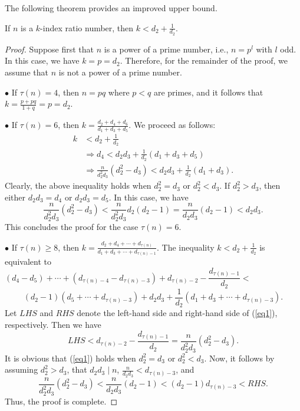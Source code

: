 \documentclass[12pt,reqno]{article}
\begin{document}
The following theorem provides an improved upper bound.

\begin{theorem}\label{th1}
If $n$ is a $k$-index ratio number, then $k<d_2+\frac{1}{d_2}$.
\end{theorem}

\begin{proof}
Suppose first that \( n \) is a power of a prime number, i.e., \( n = p^l \) with \( l \) odd. In this case, we have \( k = p = d_2 \). Therefore, for the remainder of the proof, we assume that \( n \) is not a power of a prime number.

\noindent$\bullet$ If \( \tau(n) = 4 \), then \( n = pq \) where \( p < q \) are primes, and it follows that \( k = \frac{p + pq}{1 + q} = p = d_2 \).

\noindent$\bullet$ If \( \tau(n) = 6 \), then \( k = \frac{d_2 + d_4 + d_6}{d_1 + d_3 + d_5} \). We proceed as follows:
\begin{align*}
k &< d_2 + \frac{1}{d_2} \\
&\Rightarrow d_4 < d_2 d_3 + \frac{1}{d_2} (d_1 + d_3 + d_5) \\
&\Rightarrow \frac{n}{d_2^2 d_3} \left( d_2^2 - d_3 \right) < d_2 d_3 +\frac{1}{d_2} (d_1 + d_3).
\end{align*}
Clearly, the above inequality holds when \( d_2^2 = d_3 \) or \( d_2^2 < d_3 \). If \( d_2^2 > d_3 \), then either \( d_2 d_3 = d_4 \) or \( d_2 d_3 = d_5 \). In this case, we have
\begin{equation*}
\frac{n}{d_2^2 d_3} \left( d_2^2 - d_3 \right) < \frac{n}{d_2^2 d_3} d_2 \left( d_2 - 1 \right) = \frac{n}{d_2 d_3} \left( d_2 - 1 \right) < d_2 d_3.
\end{equation*}
This concludes the proof for the case \( \tau(n) = 6 \).

\noindent$\bullet$ If \( \tau(n) \geq 8 \), then \( k = \frac{d_2 + d_4 + \cdots + d_{\tau(n)}}{d_1 + d_3 + \cdots + d_{\tau(n)-1}} \). The inequality \( k < d_2 + \frac{1}{d_2} \) is equivalent to
\\$(d_4-d_5)+\cdots+(d_{\tau(n)-4}-d_{\tau(n)-3})+d_{\tau(n)-2}-\dfrac{d_{\tau(n)-1}}{d_2}<$
\begin{equation}\label{eq1}
(d_2-1)(d_5+\cdots+d_{\tau(n)-3})+d_2d_3+\frac{1}{d_2}(d_1+d_3+\cdots+d_{\tau(n)-3}).
\end{equation}
Let \( LHS \) and \( RHS \) denote the left-hand side and right-hand side of (\ref{eq1}), respectively. Then we have
\begin{equation*}
LHS < d_{\tau(n)-2} - \frac{d_{\tau(n)-1}}{d_2} = \frac{n}{d_2^2 d_3} \left( d_2^2 - d_3 \right).
\end{equation*}
It is obvious that (\ref{eq1}) holds when \( d_2^2 = d_3 \) or \( d_2^2 < d_3 \). Now, it follows by assuming \( d_2^2 > d_3 \), that \( d_2 d_3 \mid n \), \( \frac{n}{d_2 d_3} < d_{\tau(n)-3} \), and
\begin{equation*}
\frac{n}{d_2^2 d_3} \left( d_2^2 - d_3 \right) < \frac{n}{d_2 d_3} \left( d_2 - 1 \right) < (d_2 - 1) d_{\tau(n)-3} < RHS.
\end{equation*}
Thus, the proof is complete.
\end{proof}
\end{document}
